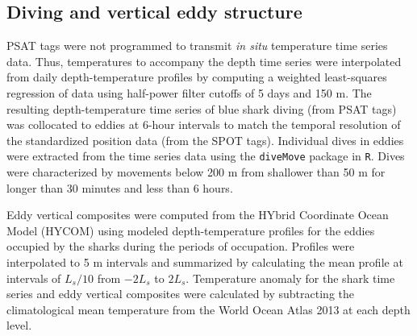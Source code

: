 \subsection{Diving and vertical eddy structure}

PSAT tags were not programmed to transmit \textit{in situ} temperature time series data. Thus, temperatures to accompany the depth time series were interpolated from daily depth-temperature profiles by computing a weighted least-squares regression of data using half-power filter cutoffs of 5 days and 150 m. The resulting depth-temperature time series of blue shark diving (from PSAT tags) was collocated to eddies at 6-hour intervals to match the temporal resolution of the standardized position data (from the SPOT tags). Individual dives in eddies were extracted from the time series data using the \texttt{diveMove} package \citep{Luque2007} in \texttt{R}. Dives were characterized by movements below 200 m from shallower than 50 m for longer than 30 minutes and less than 6 hours.

Eddy vertical composites were computed from the HYbrid Coordinate Ocean Model (HYCOM)\citep{Chassignet2007} using modeled depth-temperature profiles for the eddies occupied by the sharks during the periods of occupation. Profiles were interpolated to 5 m intervals and summarized by calculating the mean profile at intervals of $L_s/10$ from $-2 L_s$ to $2 L_s$. Temperature anomaly for the shark time series and eddy vertical composites were calculated by subtracting the climatological mean temperature from the World Ocean Atlas 2013 \citep{Locarnini2013} at each depth level.

